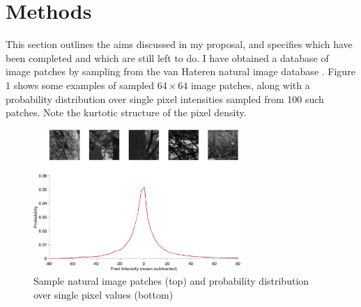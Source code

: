 \documentclass[10pt,twocolumn,letterpaper]{article}
\begin{document}


\section{Methods}
This section outlines the aims discussed in my proposal, and specifies which have been completed and which are still left to do. I have obtained a database of image patches by sampling from the van Hateren natural image database \cite{vanhateren}. Figure 1 shows some examples of sampled $64\times64$ image patches, along with a probability distribution over single pixel intensities sampled from 100 such patches. Note the kurtotic structure of the pixel density.

\begin{figure}
\begin{center}
   \includegraphics[width=0.7\textwidth]{example_patches.png}
   \caption{Sample natural image patches (top) and probability distribution over single pixel values (bottom)}
\end{center}
\label{fig:ex}
\end{figure}
\end{document}
